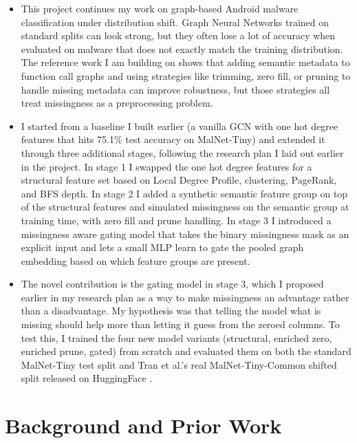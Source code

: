 \documentclass[12pt]{article}
\begin{document}
\begin{itemize}
    \item This project continues my work on graph-based Android malware classification under distribution shift. Graph Neural Networks trained on standard splits can look strong, but they often lose a lot of accuracy when evaluated on malware that does not exactly match the training distribution. The reference work I am building on \cite{tran2025} shows that adding semantic metadata to function call graphs and using strategies like trimming, zero fill, or pruning to handle missing metadata can improve robustness, but those strategies all treat missingness as a preprocessing problem.
    \item I started from a baseline I built earlier (a vanilla GCN with one hot degree features that hits 75.1\% test accuracy on MalNet-Tiny) and extended it through three additional stages, following the research plan I laid out earlier in the project. In stage 1 I swapped the one hot degree features for a structural feature set based on Local Degree Profile, clustering, PageRank, and BFS depth. In stage 2 I added a synthetic semantic feature group on top of the structural features and simulated missingness on the semantic group at training time, with zero fill and prune handling. In stage 3 I introduced a missingness aware gating model that takes the binary missingness mask as an explicit input and lets a small MLP learn to gate the pooled graph embedding based on which feature groups are present.
    \item The novel contribution is the gating model in stage 3, which I proposed earlier in my research plan as a way to make missingness an advantage rather than a disadvantage. My hypothesis was that telling the model what is missing should help more than letting it guess from the zeroed columns. To test this, I trained the four new model variants (structural, enriched zero, enriched prune, gated) from scratch and evaluated them on both the standard MalNet-Tiny test split and Tran et al.'s real MalNet-Tiny-Common shifted split released on HuggingFace \cite{nntvuhf}.
\end{itemize}

\section{Background and Prior Work}
\end{document}
